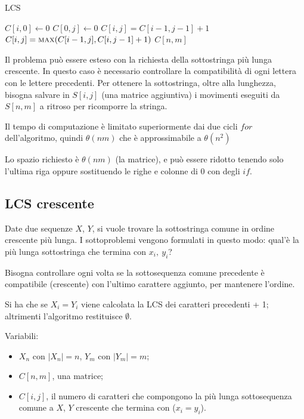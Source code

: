 \begin{algorithm}
	\caption{LCS}
	\begin{algorithmic}
				\State $C[i, 0] \gets 0$
			\EndFor
				\State $C[0, j] \gets 0$
			\EndFor
						\State $C[i, j] = C[i-1, j-1] + 1$
					\Else
						\State $C[i, j] = \Call {max}{C[i-1, j], C[i, j-1]+1}$
					\EndIf
				\EndFor
			\EndFor
			\State \Return $C[n, m]$
		\EndFunction
	\end{algorithmic}
\end{algorithm}

Il problema può essere esteso con la richiesta della sottostringa più lunga crescente. In questo caso è necessario controllare la compatibilità di ogni lettera con le lettere precedenti.
Per ottenere la sottostringa, oltre alla lunghezza, bisogna salvare in $S[i, j]$ (una matrice aggiuntiva) i movimenti eseguiti da $S[n, m]$ a ritroso per ricomporre la stringa.

Il tempo di computazione è limitato superiormente dai due cicli $for$ dell'algoritmo, quindi $\theta(nm)$ che è approssimabile a $\theta(n^2)$

Lo spazio richiesto è $\theta(nm)$ (la matrice), e può essere ridotto tenendo solo l'ultima riga oppure sostituendo le righe e colonne di $0$ con degli $if$.

\subsection{LCS crescente}
Date due sequenze $X$, $Y$, si vuole trovare la sottostringa comune in ordine crescente più lunga. I sottoproblemi vengono formulati in questo modo: qual'è la più lunga sottostringa che termina con $x_i,\ y_i$? 

Bisogna controllare ogni volta se la sottosequenza comune precedente è compatibile (crescente) con l'ultimo carattere aggiunto, per mantenere l'ordine. 

Si ha che se $X_i = Y_i$ viene calcolata la LCS dei caratteri precedenti + 1; altrimenti l'algoritmo restituisce $\emptyset$.

Variabili:
\begin{itemize}
	\item $X_n$ con $|X_n| = n$, $Y_m$ con $|Y_m| = m$;
	\item $C[n, m]$, una matrice;
	\item $C[i, j]$, il numero di caratteri che compongono la più lunga sottosequenza comune a $X$, $Y$ crescente che termina con ($x_i = y_i$).
\end{itemize}


